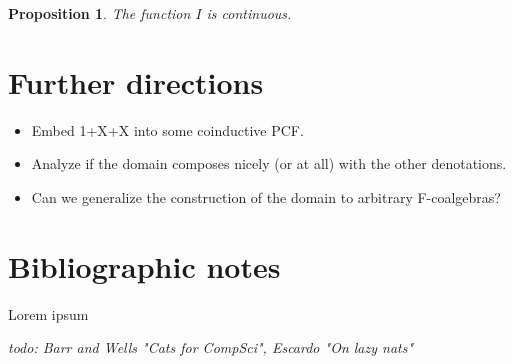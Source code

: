 \documentclass[a4paper]{article}
\newcommand{\todo}[1]{\bigskip \noindent \emph{todo: #1}}
\newtheorem{thmIIsContinuous}[defNuF]{Proposition}
\begin{document}
\begin{thmIIsContinuous}

The function $I$ is continuous.

\end{thmIIsContinuous}

\section{Further directions}

\begin{itemize}
\item Embed 1+X+X into some coinductive PCF.
\item Analyze if the domain composes nicely (or at all) with the other
denotations.
\item Can we generalize the construction of the domain to arbitrary
F-coalgebras?
\end{itemize}

\section{Bibliographic notes}

Lorem ipsum \cite{Pierce1991} \cite{Gunter1992} \cite{Bird1997}
\cite{Mitchell1996} \cite{Allison1986} \cite{Capretta2002}

\todo{Barr and Wells "Cats for CompSci", Escardo "On lazy nats"}



\end{document}
